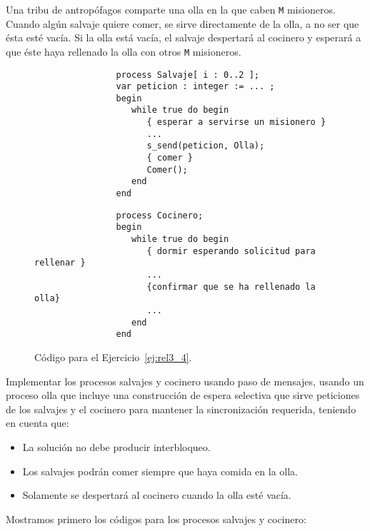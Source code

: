 \begin{ejercicio}\label{ej:rel3_4}
    Una tribu de antropófagos comparte una olla en la que caben \verb|M| misioneros. Cuando algún salvaje quiere comer, se sirve directamente de la olla, a no ser que ésta esté vacía. Si la olla está vacía, el salvaje despertará al cocinero y esperará a que éste haya rellenado la olla con otros \verb|M| misioneros.
    \begin{figure}[H]
        \centering
        \setlength{\columnsep}{1cm}
        \begin{multicols}{2}
            \begin{verbatim}
                process Salvaje[ i : 0..2 ];
                var peticion : integer := ... ;
                begin
                   while true do begin
                      { esperar a servirse un misionero }
                      ...
                      s_send(peticion, Olla);
                      { comer }
                      Comer();
                   end
                end
            \end{verbatim}
            \begin{verbatim}
                process Cocinero;
                begin
                   while true do begin
                      { dormir esperando solicitud para rellenar }
                      ...
                      {confirmar que se ha rellenado la olla}
                      ...
                   end
                end
            \end{verbatim}
        \end{multicols}
        \caption{Código para el Ejercicio~\ref{ej:rel3_4}.}
        \label{fig:cod_4}
    \end{figure}
    Implementar los procesos salvajes y cocinero usando paso de mensajes, usando un proceso olla que incluye una construcción de espera selectiva que sirve peticiones de los salvajes y el cocinero para mantener la sincronización requerida, teniendo en cuenta que:
    \begin{itemize}
        \item La solución no debe producir interbloqueo.
        \item Los salvajes podrán comer siempre que haya comida en la olla.
        \item Solamente se despertará al cocinero cuando la olla esté vacía.
    \end{itemize}
    Mostramos primero los códigos para los procesos salvajes y cocinero:
    \begin{figure}[H]

\end{figure}
\end{ejercicio}
